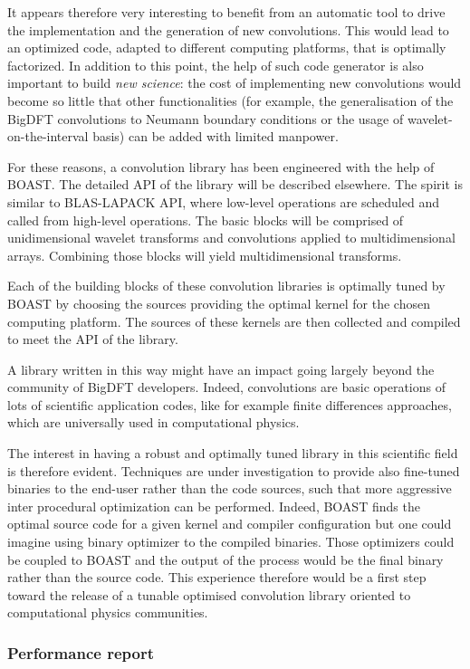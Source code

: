 \documentclass[11pt, a4paper, twoside]{montblanc}
\begin{document}
It appears therefore very interesting to benefit from an automatic tool to drive
the implementation and the generation of new convolutions.  This would lead to
an optimized code, adapted to different computing platforms, that is optimally
factorized.  In addition to this point, the help of such code generator is also
important to build \emph{new science}: the cost of implementing new
convolutions would become so little that other functionalities (for example,
the generalisation of the BigDFT convolutions to Neumann boundary conditions
or the usage of wavelet-on-the-interval basis) can be added with limited
manpower.

For these reasons, a convolution library has been engineered with the help of
BOAST.  The detailed API of the library will be described elsewhere.  The
spirit is similar to BLAS-LAPACK API, where low-level operations are scheduled
and called from high-level operations. The basic blocks will be comprised of
unidimensional wavelet transforms and convolutions applied to multidimensional
arrays. Combining those blocks will yield multidimensional transforms.

Each of the building blocks of these convolution libraries is optimally tuned
by BOAST by choosing the sources providing the optimal kernel for the chosen
computing platform.  The sources of these kernels are then collected and
compiled to meet the API of the library.

A library written in this way might have an impact going largely beyond the
community of BigDFT developers.  Indeed, convolutions are basic operations of
lots of scientific application codes, like for example finite differences
approaches, which are universally used in computational physics.

The interest in having a robust and optimally tuned library in this scientific
field is therefore evident. Techniques are under investigation to provide also
fine-tuned binaries to the end-user rather than the code sources, such that
more aggressive inter procedural optimization can be performed. Indeed, BOAST
finds the optimal source code for a given kernel and compiler configuration but
one could imagine using binary optimizer to the compiled binaries. Those
optimizers could be coupled to BOAST and the output of the process would be the
final binary rather than the source code. This experience therefore would be a
first step toward the release of a tunable optimised convolution library
oriented to computational physics communities.


    \subsubsection{Performance report}
\end{document}
